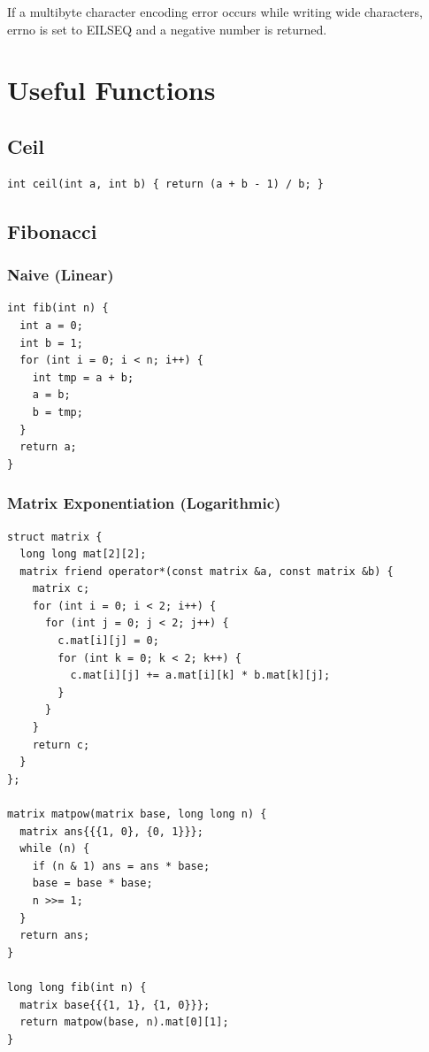 \documentclass[10pt]{article}
\begin{document}
If a multibyte character encoding error occurs while writing wide characters,
errno is set to EILSEQ and a negative number is returned.

\section{Useful Functions}

\subsection{Ceil}

\begin{lstlisting}
int ceil(int a, int b) { return (a + b - 1) / b; }
\end{lstlisting}

\subsection{Fibonacci}

\subsubsection{Naive (Linear)}

\begin{lstlisting}
int fib(int n) {
  int a = 0;
  int b = 1;
  for (int i = 0; i < n; i++) {
    int tmp = a + b;
    a = b;
    b = tmp;
  }
  return a;
}
\end{lstlisting}

\subsubsection{Matrix Exponentiation (Logarithmic)}

\begin{lstlisting}
struct matrix {
  long long mat[2][2];
  matrix friend operator*(const matrix &a, const matrix &b) {
    matrix c;
    for (int i = 0; i < 2; i++) {
      for (int j = 0; j < 2; j++) {
        c.mat[i][j] = 0;
        for (int k = 0; k < 2; k++) {
          c.mat[i][j] += a.mat[i][k] * b.mat[k][j];
        }
      }
    }
    return c;
  }
};

matrix matpow(matrix base, long long n) {
  matrix ans{{{1, 0}, {0, 1}}};
  while (n) {
    if (n & 1) ans = ans * base;
    base = base * base;
    n >>= 1;
  }
  return ans;
}

long long fib(int n) {
  matrix base{{{1, 1}, {1, 0}}};
  return matpow(base, n).mat[0][1];
}
\end{lstlisting}
\end{document}
